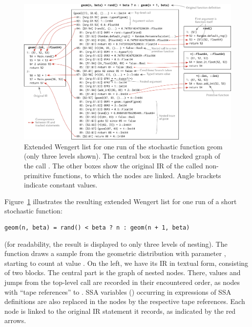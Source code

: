 \begin{figure}[t]
  \centering
  \includegraphics[width=\textwidth]{figures/extended-wengert-list}
  \caption{Extended Wengert list for one run of the stochastic function geom (only three levels
    shown). The central box is the tracked graph of the call \protect{}. The other
    boxes show the original IR of the called non-primitive functions, to which the nodes are
    linked.  Angle brackets indicate constant values.}
  \label{fig:ext-wengert-list}
\end{figure}

Figure~\ref{fig:ext-wengert-list} illustrates the resulting extended Wengert list for one run of a
short stochastic function:
\begin{lstlisting}
geom(n, beta) = rand() < beta ? n : geom(n + 1, beta)
\end{lstlisting}
(for readability, the result is displayed to only three levels of nesting).  The function draws a
sample from the geometric distribution with parameter , starting to count at value
. On the left, we have its IR in textual form, consisting of two blocks. The central part
is the graph of nested nodes.  There, values and jumps from the top-level call are recorded in their
encountered order, as nodes with \enquote{tape references}  to . SSA variables
() occurring in expressions of SSA definitions are also replaced in the nodes by the
respective tape references.  Each node is linked to the original IR statement it records, as
indicated by the red arrows.

